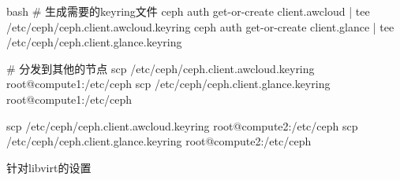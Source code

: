 \begin{outline}[enumerate]
\begin{code-block}{bash}
# 生成需要的keyring文件
ceph auth get-or-create client.awcloud | tee /etc/ceph/ceph.client.awcloud.keyring
ceph auth get-or-create client.glance | tee /etc/ceph/ceph.client.glance.keyring

# 分发到其他的节点
scp /etc/ceph/ceph.client.awcloud.keyring root@compute1:/etc/ceph
scp /etc/ceph/ceph.client.glance.keyring root@compute1:/etc/ceph

scp /etc/ceph/ceph.client.awcloud.keyring root@compute2:/etc/ceph
scp /etc/ceph/ceph.client.glance.keyring root@compute2:/etc/ceph
\end{code-block}

  \1 针对libvirt的设置

\end{outline}
